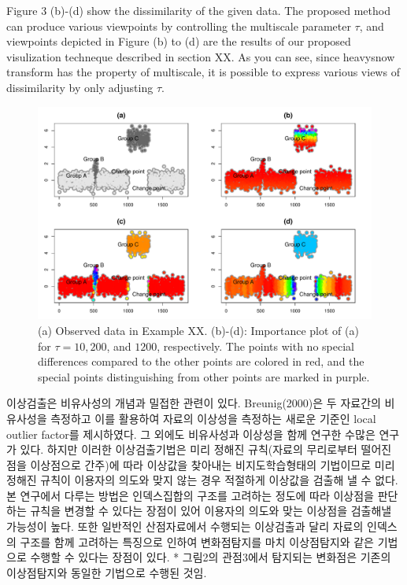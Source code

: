 \documentclass[preprint, review, 12pt]{article}
\theoremstyle{definition}
\theoremstyle{remark}
\begin{document}
Figure 3 (b)-(d) show the dissimilarity of the given data. The proposed method can produce various viewpoints by controlling the multiscale parameter $\tau$,  and viewpoints depicted in Figure (b) to (d) are the results of our proposed visulization techneque described in section XX. As you can see, since heavysnow transform has the property of multiscale, it is possible to express various views of dissimilarity by only adjusting $\tau$.

\begin{figure}
\centering
\includegraphics[width=1\textwidth]{Fig/Fig3.pdf}
\caption{(a) Observed data in Example XX. (b)-(d): Importance plot of (a) for $\tau=10, 200$, and $1200$, respectively. The points with no special differences compared to the other points are colored in red, and the special points distinguishing from other points are marked in purple.}
\end{figure}

이상검출은 비유사성의 개념과 밀접한 관련이 있다. Breunig(2000)은 두 자료간의 비유사성을 측정하고 이를 활용하여 자료의 이상성을 측정하는 새로운 기준인 local outlier factor를 제시하였다. 그 외에도 비유사성과 이상성을 함께 연구한 수많은 연구가 있다. 하지만 이러한 이상검출기법은 미리 정해진 규칙(자료의 무리로부터 떨어진 점을 이상점으로 간주)에 따라 이상값을 찾아내는 비지도학습형태의 기법이므로 미리 정해진 규칙이 이용자의 의도와 맞지 않는 경우 적절하게 이상값을 검출해 낼 수 없다. 본 연구에서 다루는 방법은 인덱스집합의 구조를 고려하는 정도에 따라 이상점을 판단하는 규칙을 변경할 수 있다는 장점이 있어 이용자의 의도와 맞는 이상점을 검출해낼 가능성이 높다. 또한 일반적인 산점자료에서 수행되는 이상검출과 달리 자료의 인덱스의 구조를 함께 고려하는 특징으로 인하여 변화점탐지를 마치 이상점탐지와 같은 기법으로 수행할 수 있다는 장점이 있다.  
* 그림2의 관점3에서 탐지되는 변화점은 기존의 이상점탐지와 동일한 기법으로 수행된 것임.
\end{document}
